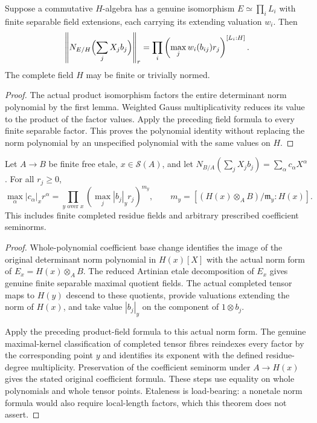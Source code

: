 \begin{theorem}
\label{spectrum:weighted-product-norm-without-infinitude}
\leanok
{}
Suppose a commutative $H$-algebra has a genuine isomorphism
$E\simeq\prod_iL_i$ with finite separable field extensions, each carrying
its extending valuation $w_i$. Then
\[
 \left\|N_{E/H}\Bigl(\sum_j X_jb_j\Bigr)\right\|_r
 =\prod_i\left(\max_jw_i(b_{ij})r_j\right)^{[L_i:H]}.
\]
The complete field $H$ may be finite or trivially normed.
\end{theorem}
\begin{proof}
The actual product isomorphism factors the entire determinant norm
polynomial by the first lemma. Weighted Gauss multiplicativity reduces
its value to the product of the factor values. Apply the preceding field
formula to every finite separable factor. This proves the polynomial
identity without replacing the norm polynomial by an unspecified
polynomial with the same values on $H$.
\end{proof}

\begin{theorem}
\label{spectrum:weighted-etale-norm-without-infinitude}
\leanok
{}
Let $A\to B$ be finite free etale, $x\in\mathcal S(A)$, and let
$N_{B/A}(\sum_j X_jb_j)=\sum_\alpha c_\alpha X^\alpha$. For all $r_j\ge0$,
\[
 \max_\alpha |c_\alpha|_x r^\alpha
 =\prod_{y\text{ over }x}\left(\max_j|b_j|_y r_j\right)^{m_y},
 \qquad m_y=[(H(x)\otimes_A B)/\mathfrak m_y:H(x)].
\]
This includes finite completed residue fields and arbitrary prescribed
coefficient seminorms.
\end{theorem}
\begin{proof}
Whole-polynomial coefficient base change identifies the image of the
original determinant norm polynomial in $H(x)[X]$ with the actual norm
form of $E_x=H(x)\otimes_A B$. The reduced Artinian etale decomposition
of $E_x$ gives genuine finite separable maximal quotient fields.
The actual completed tensor maps to $H(y)$ descend to these quotients,
provide valuations extending the norm of $H(x)$, and take value $|b_j|_y$
on the component of $1\otimes b_j$.

Apply the preceding product-field formula to this actual norm form.
The genuine maximal-kernel classification of completed tensor fibres
reindexes every factor by the corresponding point $y$ and identifies
its exponent with the defined residue-degree multiplicity. Preservation
of the coefficient seminorm under $A\to H(x)$ gives the stated original
coefficient formula. These steps use equality on whole polynomials and
whole tensor points. Etaleness is load-bearing: a nonetale norm formula
would also require local-length factors, which this theorem does not
assert.
\end{proof}

